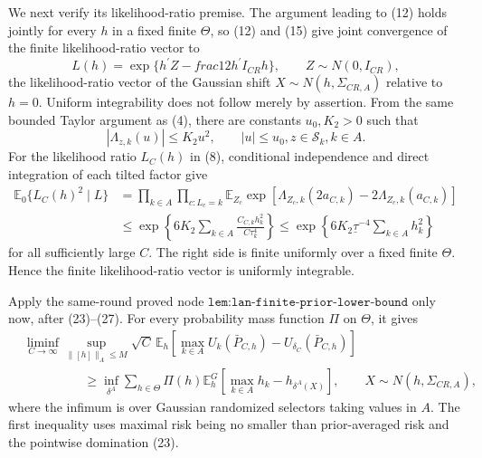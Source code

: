 We next verify its likelihood-ratio premise.  The argument leading to (12) holds jointly for every \(h\) in a fixed finite \(\Theta\), so (12) and (15) give joint convergence of the finite likelihood-ratio vector to
\[
L(h)=\exp\{h^{\prime}Z-  frac12h^{\prime}I_{CR}h\},
\qquad Z\sim N(0,I_{CR}),
\tag{25}
\]
the likelihood-ratio vector of the Gaussian shift \(X\sim N(h,\Sigma_{CR,A})\) relative to \(h=0\).  Uniform integrability does not follow merely by assertion.  From the same bounded Taylor argument as (4), there are constants \(u_0,K_2>0\) such that
\[
|\Lambda_{z,k}(u)|\leq K_2u^2,
\qquad |u|\leq u_0, z\in\mathcal S_k, k\in A.
\tag{26}
\]
For the likelihood ratio \(L_C(h)\) in (8), conditional independence and direct integration of each tilted factor give
\[
\begin{split}
\mathbb E_0\{L_C(h)^2\mid L\}
&=\prod_{k\in A}\prod_{c:L_c=k}
\mathbb E_{Z_c}\exp\!\left[
\Lambda_{Z_c,k}(2a_{C,k})-2\Lambda_{Z_c,k}(a_{C,k})
\right]\\
&\leq
\exp\!\left\{6K_2\sum_{k\in A}
\frac{C_{C,k}h_k^2}{C\tau_k^4}\right\}
\leq
\exp\!\left\{6K_2\underline\tau^{-4}\sum_{k\in A}h_k^2\right\}
\end{split}
\tag{27}
\]
for all sufficiently large \(C\).  The right side is finite uniformly over a fixed finite \(\Theta\).  Hence the finite likelihood-ratio vector is uniformly integrable.

Apply the same-round proved node \(\texttt{lem:lan-finite-prior-lower-bound}\) only now, after (23)--(27).  For every probability mass function \(\Pi\) on \(\Theta\), it gives
\[
\begin{split}
&\liminf_{C\to\infty}\sup_{\lVert[h]\rVert_A\leq M}
\sqrt C\,\mathbb E_h\!\left[
\max_{k\in A}U_k(\bar P_{C,h})-U_{\delta_C}(\bar P_{C,h})
\right]\\
&\hspace{2cm}\geq
\inf_{\delta^A}\sum_{h\in\Theta}\Pi(h)
\mathbb E_h^G\!\left[\max_{k\in A}h_k-h_{\delta^A(X)}\right],
\qquad X\sim N(h,\Sigma_{CR,A}),
\end{split}
\tag{28}
\]
where the infimum is over Gaussian randomized selectors taking values in \(A\).  The first inequality uses maximal risk being no smaller than prior-averaged risk and the pointwise domination (23).

